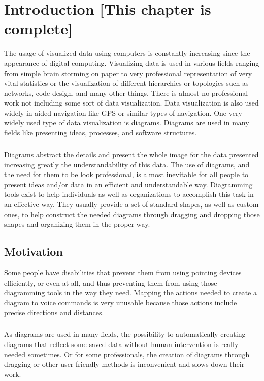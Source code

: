 \chapter{Introduction [This chapter is complete]}
\beginchapter
The usage of visualized data using computers is constantly increasing since the appearance of digital computing. Visualizing data is used in various fields ranging from simple brain storming on paper to very professional representation of very vital statistics or the visualization of different hierarchies or topologies such as networks, code design, and many other things. There is almost no professional work not including some sort of data visualization.
Data visualization is also used widely in aided navigation like GPS or similar types of navigation.
One very widely used type of data visualization is diagrams. Diagrams are used in many fields like presenting ideas, processes, and software structures.

\paragraph{}
Diagrams abstract the details and present the whole image for the data presented increasing greatly the understandability of this data. The use of diagrams, and the need for them to be look professional, is almost inevitable for all people to present ideas and/or data in an efficient and understandable way. Diagramming tools exist to help individuals as well as organizations to accomplish this task in an effective way. They usually provide a set of standard shapes, as well as custom ones, to help construct the needed diagrams through dragging and dropping those shapes and organizing them in the proper way.

\section{Motivation}
Some people have disabilities that prevent them from using pointing devices efficiently, or even at all, and thus preventing them from using those diagramming tools in the way they need. Mapping the actions needed to create a diagram to voice commands is very unusable because those actions include precise directions and distances.

\paragraph{}
As diagrams are used in many fields, the possibility to automatically creating diagrams that reflect some saved data without human intervention is really needed sometimes. Or for some professionals, the creation of diagrams through dragging or other user friendly methods is inconvenient and slows down their work.

